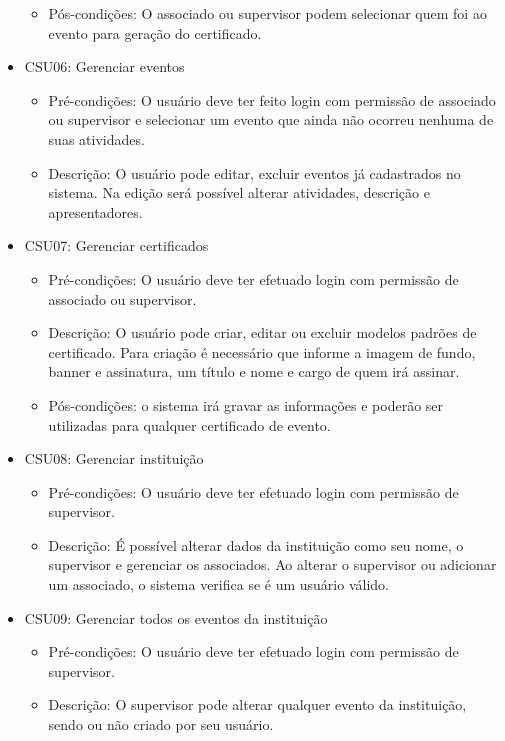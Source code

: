 \begin{itemize}
\begin{itemize}
            \item Pós-condições: O associado ou supervisor podem selecionar quem foi ao evento para geração do certificado.
        \end{itemize}
    \item CSU06: Gerenciar eventos
        \begin{itemize}
            \item Pré-condições: O usuário deve ter feito login com permissão de associado ou supervisor e selecionar um evento que ainda não ocorreu nenhuma de suas atividades.
            \item Descrição: O usuário pode editar, excluir eventos já cadastrados no sistema. Na edição será possível alterar atividades, descrição e apresentadores.
        \end{itemize}
    \item CSU07: Gerenciar certificados
        \begin{itemize}
            \item Pré-condições: O usuário deve ter efetuado login com permissão de associado ou supervisor.
            \item Descrição: O usuário pode criar, editar ou excluir modelos padrões de certificado. Para criação é necessário que informe a imagem de fundo, banner e assinatura, um título e nome e cargo de quem irá assinar.
            \item Pós-condições: o sistema irá gravar as informações e poderão ser utilizadas para qualquer certificado de evento.
        \end{itemize}
    \item CSU08: Gerenciar instituição
        \begin{itemize}
            \item Pré-condições: O usuário deve ter efetuado login com permissão de supervisor.
            \item Descrição: É possível alterar dados da instituição como seu nome, o supervisor e gerenciar os associados. Ao alterar o supervisor ou adicionar um associado, o sistema verifica se é um usuário válido.
        \end{itemize}
    \item CSU09: Gerenciar todos os eventos da instituição
        \begin{itemize}
            \item Pré-condições: O usuário deve ter efetuado login com permissão de supervisor.
            \item Descrição: O supervisor pode alterar qualquer evento da instituição, sendo ou não criado por seu usuário.

\end{itemize}
\end{itemize}

